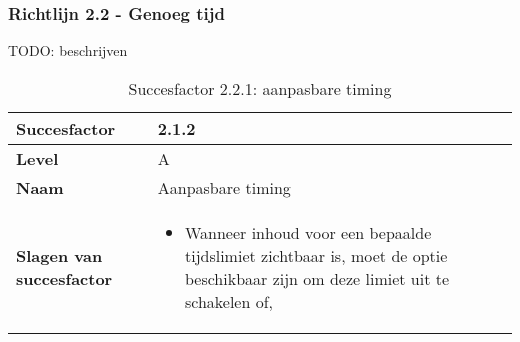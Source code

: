 \subsubsection{Richtlijn 2.2 - Genoeg tijd}
TODO: beschrijven
\begin{table}[H]
    \centering
    \caption{Succesfactor 2.2.1: aanpasbare timing}
    
    
    \hspace*{-1cm}\begin{tabular}{|l|p{12cm}|} 
        \hline
        \textbf{Succesfactor}                 & 2.1.2                                                                                                                                                                                                                                                                                                                                                                                                                                                                                                          \\ 
        \hline
        \textbf{Level}                        & A                                                                                                                                                                                                                                                                                                                                                                                                                                                                                                                 \\ 
        \hline
        \textbf{Naam}                         & Aanpasbare timing~                                                                                                                                                                                                                                                                                                                                                                                                                                                                                      \\ 
        \hline
        \textbf{Slagen van succesfactor}      & \begin{itemize}
            \item Wanneer inhoud voor een bepaalde tijdslimiet zichtbaar is, moet de optie beschikbaar zijn om deze limiet uit te schakelen of,

\end{itemize}
\end{tabular}
\end{table}
